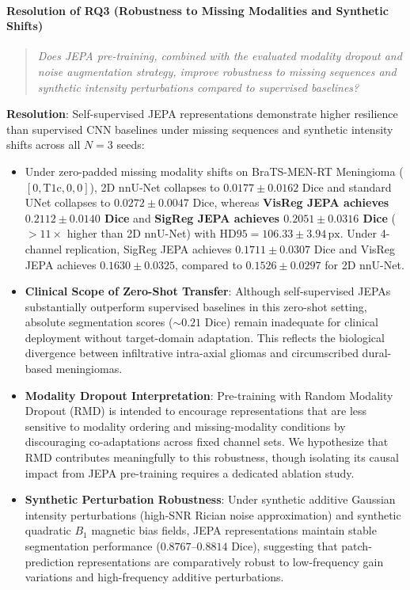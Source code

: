 \documentclass{article}
\begin{document}
\paragraph{Resolution of RQ3 (Robustness to Missing Modalities and Synthetic Shifts)}
\begin{quote}
\emph{Does JEPA pre-training, combined with the evaluated modality dropout and noise augmentation strategy, improve robustness to missing sequences and synthetic intensity perturbations compared to supervised baselines?}
\end{quote}
\textbf{Resolution}: Self-supervised JEPA representations demonstrate higher resilience than supervised CNN baselines under missing sequences and synthetic intensity shifts across all $N=3$ seeds:
\begin{itemize}
    \item Under zero-padded missing modality shifts on BraTS-MEN-RT Meningioma ($[0, \text{T1c}, 0, 0]$), 2D nnU-Net collapses to $0.0177 \pm 0.0162$ Dice and standard UNet collapses to $0.0272 \pm 0.0047$ Dice, whereas \textbf{VisReg JEPA achieves $\mathbf{0.2112 \pm 0.0140}$ Dice} and \textbf{SigReg JEPA achieves $0.2051 \pm 0.0316$ Dice} ($>11\times$ higher than 2D nnU-Net) with $\text{HD95} = 106.33 \pm 3.94\,\text{px}$. Under 4-channel replication, SigReg JEPA achieves $0.1711 \pm 0.0307$ Dice and VisReg JEPA achieves $0.1630 \pm 0.0325$, compared to $0.1526 \pm 0.0297$ for 2D nnU-Net.
    \item \textbf{Clinical Scope of Zero-Shot Transfer}: Although self-supervised JEPAs substantially outperform supervised baselines in this zero-shot setting, absolute segmentation scores ($\sim 0.21$ Dice) remain inadequate for clinical deployment without target-domain adaptation. This reflects the biological divergence between infiltrative intra-axial gliomas and circumscribed dural-based meningiomas.
    \item \textbf{Modality Dropout Interpretation}: Pre-training with Random Modality Dropout (RMD) is intended to encourage representations that are less sensitive to modality ordering and missing-modality conditions by discouraging co-adaptations across fixed channel sets. We hypothesize that RMD contributes meaningfully to this robustness, though isolating its causal impact from JEPA pre-training requires a dedicated ablation study.
    \item \textbf{Synthetic Perturbation Robustness}: Under synthetic additive Gaussian intensity perturbations (high-SNR Rician noise approximation) and synthetic quadratic $B_1$ magnetic bias fields, JEPA representations maintain stable segmentation performance ($0.8767$--$0.8814$ Dice), suggesting that patch-prediction representations are comparatively robust to low-frequency gain variations and high-frequency additive perturbations.
\end{itemize}
\end{document}
